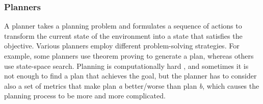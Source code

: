 \subsubsection{Planners}

A planner takes a planning problem and formulates a sequence of actions 
to transform the current state of the environment into a state 
that satisfies the objective. Various planners employ different problem-solving strategies. 
For example, some planners use theorem proving \cite{PlanningSatisfiabilitykautz1992} 
to generate a plan, whereas others use state-space search. 
Planning is computationally hard 
\cite{ComplexityDecidabilityUndecidabilityerol1995}, and 
sometimes it is not enough to find a plan that achieves the goal, 
but the planner has to consider also a set of metrics that make plan 
\textit{a} better/worse than plan \textit{b}, which causes the planning process to be more and more complicated.
